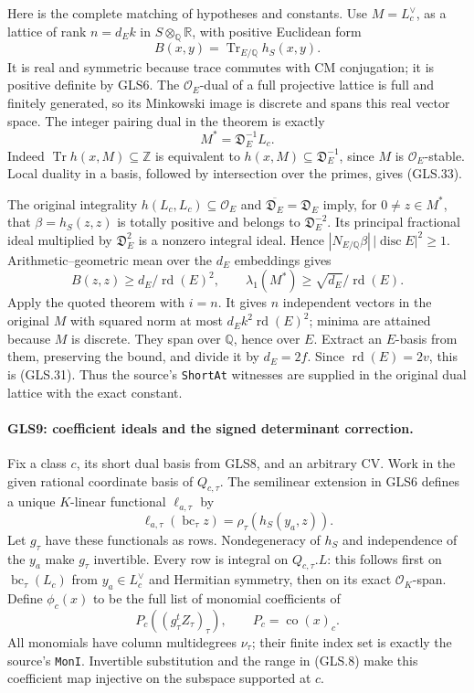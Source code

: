 Here is the complete matching of hypotheses and constants.
Use $M=L_c^\vee$, as a lattice of rank $n=d_E k$ in
$S\otimes_\mathbb Q\mathbb R$, with positive Euclidean form
\[
                  B(x,y)=\operatorname{Tr}_{E/\mathbb Q}h_S(x,y).
 \tag{GLS.32}
\]
It is real and symmetric because trace commutes with CM conjugation;
it is positive definite by GLS6.  The $\mathcal O_E$-dual of a full
projective lattice is full and finitely generated, so its Minkowski
image is discrete and spans this real vector space.  The integer
pairing dual in the theorem is exactly
\[
                  M^*=\mathfrak D_E^{-1}L_c.    \tag{GLS.33}
\]
Indeed $\operatorname{Tr}h(x,M)\subseteq\mathbb Z$ is equivalent
to $h(x,M)\subseteq\mathfrak D_E^{-1}$, since $M$ is
$\mathcal O_E$-stable.  Local duality in a basis, followed by
intersection over the primes, gives (GLS.33).

The original integrality $h(L_c,L_c)\subseteq\mathcal O_E$ and
$\overline{\mathfrak D_E}=\mathfrak D_E$ imply, for $0\ne z\in M^*$,
that $\beta=h_S(z,z)$ is totally positive and belongs to
$\mathfrak D_E^{-2}$.  Its principal fractional ideal multiplied by
$\mathfrak D_E^2$ is a nonzero integral ideal.  Hence
$|N_{E/\mathbb Q}\beta|\,|\operatorname{disc}E|^2\ge1$.
Arithmetic--geometric mean over the $d_E$ embeddings gives
\[
 B(z,z)\ge d_E/\operatorname{rd}(E)^2,
 \qquad \lambda_1(M^*)\ge\sqrt{d_E}/\operatorname{rd}(E).
 \tag{GLS.34}
\]
Apply the quoted theorem with $i=n$.  It gives $n$ independent
vectors in the original $M$ with squared norm at most
$d_Ek^2\operatorname{rd}(E)^2$; minima are attained because $M$
is discrete.  They span over $\mathbb Q$, hence over $E$.  Extract
an $E$-basis from them, preserving the bound, and divide it by
$d_E=2f$.  Since $\operatorname{rd}(E)=2v$, this is (GLS.31).
Thus the source's \texttt{ShortAt} witnesses are supplied in the
original dual lattice with the exact constant.

\paragraph{GLS9: coefficient ideals and the signed determinant correction.}
\label{claim:GLS9}
Fix a class $c$, its short dual basis from GLS8, and an arbitrary
$\mathrm{CV}$.  Work in the given rational coordinate basis of
$Q_{c,\tau}$.  The semilinear extension in GLS6 defines a unique
$K$-linear functional $\ell_{a,\tau}$ by
\[
 \ell_{a,\tau}(\operatorname{bc}_\tau z)
                         =\rho_\tau(h_S(y_a,z)).
 \tag{GLS.35}
\]
Let $g_\tau$ have these functionals as rows.  Nondegeneracy of $h_S$
and independence of the $y_a$ make $g_\tau$ invertible.  Every row
is integral on $Q_{c,\tau}.L$: this follows first on
$\operatorname{bc}_\tau(L_c)$ from $y_a\in L_c^\vee$ and
Hermitian symmetry, then on
its exact $\mathcal O_K$-span.  Define $\phi_c(x)$ to be the full
list of monomial coefficients of
\[
     P_c((g_\tau^{t}Z_\tau)_\tau),\qquad
                         P_c=\operatorname{co}(x)_c.
 \tag{GLS.36}
\]
All monomials have column multidegrees $\nu_\tau$; their finite
index set is exactly the source's \texttt{MonI}.  Invertible
substitution and the range in (GLS.8) make this coefficient map
injective on the subspace supported at $c$.

